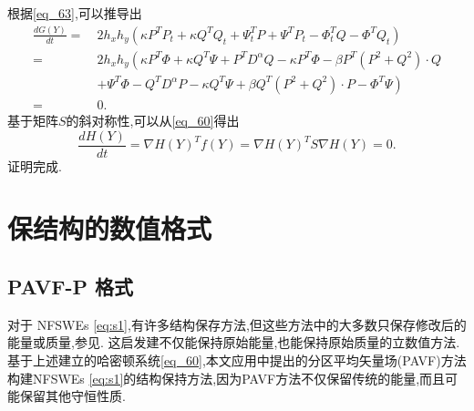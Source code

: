 \begin{pf}
	根据\eqref{eq_63},可以推导出
\begin{align}\label{eq_64}
\frac{d G(Y)}{d t}=&~2 h_{x} h_{y}\left(\kappa P^{T}P_t+\kappa Q^{T}Q_t+\Psi^{T}_t P+\Psi^{T}P_{t}-\varPhi^{T}_t Q-\varPhi^{T}Q_{t}\right)\nonumber\\
=&~2 h_{x} h_{y}\left(\kappa P^{T}\varPhi+\kappa Q^{T}\Psi + P^{T}D^{\alpha}Q-\kappa P^{T}\varPhi-\beta P^{T}\left( P^{2}+Q^{2}\right)\cdot Q\right.\nonumber\\
&~\left.+\Psi^{T}\varPhi-Q^{T}D^{\alpha}P-\kappa Q^{T}\Psi+\beta Q^{T}\left( P^{2}+Q^{2}\right)\cdot P-\varPhi^{T}\Psi\right)\nonumber\\
=&~0.
\end{align}
基于矩阵$S$的斜对称性,可以从\eqref{eq_60}得出
\begin{equation}\label{eq_65}
\frac{d H(Y)}{d t}=\nabla H(Y)^{T} f(Y)=\nabla H(Y)^{T} S \nabla H(Y)=0 .
\end{equation}
证明完成.
\end{pf}

\section{保结构的数值格式}\label{Section 3}
\subsection{PAVF-P 格式}

对于 NFSWEs \eqref{eq:s1},有许多结构保存方法,但这些方法中的大多数只保存修改后的能量或质量,参见\cite{liFastEnergyConserving2018,huEfficientEnergyPreserving2022}.
这启发建不仅能保持原始能量,也能保持原始质量的立数值方法.基于上述建立的哈密顿系统\eqref{eq_60},本文应用\cite{caiPartitionedAveragedVector2018}中提出的分区平均矢量场(PAVF)方法构建NFSWEs \eqref{eq:s1}的结构保持方法,因为PAVF方法不仅保留传统的能量,而且可能保留其他守恒性质.

